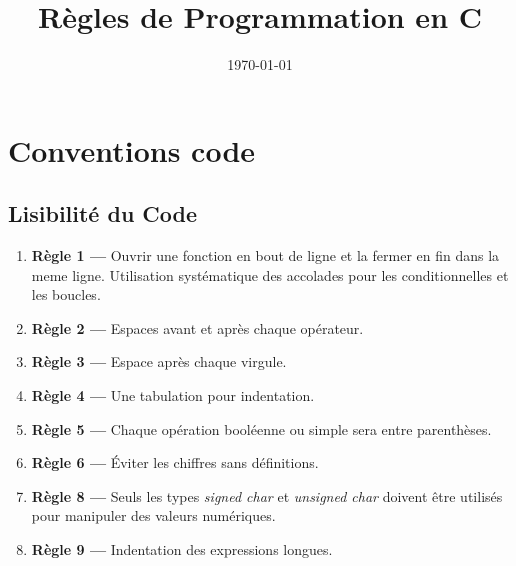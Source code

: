 \documentclass{article}
\begin{document}
\title{Règles de Programmation en C}

\date{\today}

\maketitle

\section*{Conventions code}
\subsection{Lisibilité du Code}
\begin{enumerate}
    \item \textbf{Règle 1 —} Ouvrir une fonction en bout de ligne et la fermer en fin dans la meme ligne. Utilisation systématique des accolades pour les conditionnelles
et les boucles.
    \item \textbf{Règle 2 —} Espaces avant et après chaque opérateur.
    \item \textbf{Règle 3 —} Espace après chaque virgule.
    \item \textbf{Règle 4 —} Une tabulation pour indentation.
    \item \textbf{Règle 5 —} Chaque opération booléenne ou simple sera entre parenthèses.
    \item \textbf{Règle 6 —} Éviter les chiffres sans définitions.
    
     \item \textbf{Règle 8 —} Seuls les types \textit{signed char} et \textit{unsigned char} 
doivent être utilisés pour manipuler des valeurs numériques.
     \item \textbf{Règle 9 —}  Indentation des expressions longues.

\end{enumerate}
\end{document}

